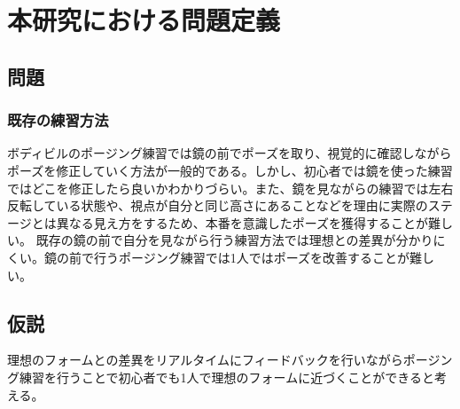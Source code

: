 \chapter{本研究における問題定義}
\label{issue}
\section{問題}
\subsection{既存の練習方法}
ボディビルのポージング練習では鏡の前でポーズを取り、視覚的に確認しながらポーズを修正していく方法が一般的である。しかし、初心者では鏡を使った練習ではどこを修正したら良いかわかりづらい。また、鏡を見ながらの練習では左右反転している状態や、視点が自分と同じ高さにあることなどを理由に実際のステージとは異なる見え方をするため、本番を意識したポーズを獲得することが難しい。
既存の鏡の前で自分を見ながら行う練習方法では理想との差異が分かりにくい。鏡の前で行うポージング練習では1人ではポーズを改善することが難しい。

\section{仮説}
理想のフォームとの差異をリアルタイムにフィードバックを行いながらポージング練習を行うことで初心者でも1人で理想のフォームに近づくことができると考える。

